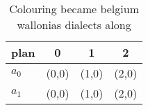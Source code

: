 \documentclass[a4paper]{article}
\begin{document}
\begin{table}
\begin{adjustbox}{width=0.6\columnwidth}
\begin{tabular}{|l|l|l|l|}
\hline
\textbf{plan} & \multicolumn{1}{c|}{\textbf{0}} & \multicolumn{1}{c|}{\textbf{1}} & \multicolumn{1}{c|}{\textbf{2}} \\ \hline
\textbf{$a_0$}  & (0,0) & (1,0) & (2,0) \\ \hline
\textbf{$a_1$}  & (0,0) & (1,0) & (2,0) \\ \hline
\end{tabular}
\end{adjustbox}
\caption{Colouring became belgium wallonias dialects along
}
\end{table}
\end{document}
